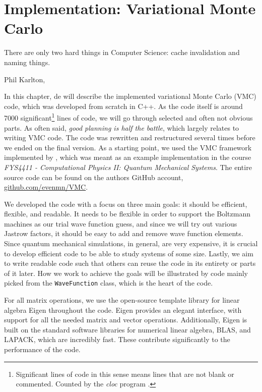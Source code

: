 \chapter{Implementation: Variational Monte Carlo} \label{chp:WFE}
\epigraph{There are only two hard things in Computer Science: cache invalidation and naming things.}{Phil Karlton, \cite{fowler_bliki:_nodate}}
\iffalse
\begin{figure}[H]
	\centering
	\texttt{[image: Images/example.png]}
	\caption{Caption}
\end{figure}
\fi

In this chapter, de will describe the implemented variational Monte Carlo (VMC) code, which was developed from scratch in C++. As the code itself is around 7000 significant\footnote{Significant lines of code in this sense means lines that are not blank or commented. Counted by the \textit{cloc} program \cite{aldanial_cloc_2019}.} lines of code, we will go through selected and often not obvious parts. As often said, \textit{good planning is half the battle}, which largely relates to writing VMC code. The code was rewritten and restructured several times before we ended on the final version. As a starting point, we used the VMC framework implemented by \citet{ledum_simple_2016}, which was meant as an example implementation in the course \textit{FYS4411 - Computational Physics II: Quantum Mechanical Systems}. The entire source code can be found on the authors GitHub account, \url{github.com/evenmn/VMC}.

We developed the code with a focus on three main goals: it should be efficient, flexible, and readable. It needs to be flexible in order to support the Boltzmann machines as our trial wave function guess, and since we will try out various Jastrow factors, it should be easy to add and remove wave function elements. Since quantum mechanical simulations, in general, are very expensive, it is crucial to develop efficient code to be able to study systems of some size. Lastly, we aim to write readable code such that others can reuse the code in its entirety or parts of it later.  How we work to achieve the goals will be illustrated by code mainly picked from the \lstinline{WaveFunction} class, which is the heart of the code.

For all matrix operations, we use the open-source template library for linear algebra Eigen throughout the code. Eigen provides an elegant interface, with support for all the needed matrix and vector operations. Additionally, Eigen is built on the standard software libraries for numerical linear algebra, BLAS, and LAPACK, which are incredibly fast. These contribute significantly to the performance of the code. 

